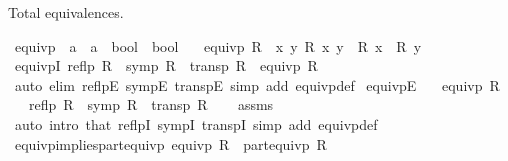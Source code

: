 \begin{isabellebody}
%
\begin{isamarkuptext}%
Total equivalences.%
\end{isamarkuptext}\isamarkuptrue%
\isamarkupfalse%
\ equivp\ {\isacharcolon}{\kern0pt}{\isacharcolon}{\kern0pt}\ {\isachardoublequoteopen}{\isacharparenleft}{\kern0pt}{\isacharprime}{\kern0pt}a\ {\isasymRightarrow}\ {\isacharprime}{\kern0pt}a\ {\isasymRightarrow}\ bool{\isacharparenright}{\kern0pt}\ {\isasymRightarrow}\ bool{\isachardoublequoteclose}\isanewline
\ \ \ {\isachardoublequoteopen}equivp\ R\ {\isasymlongleftrightarrow}\ {\isacharparenleft}{\kern0pt}{\isasymforall}x\ y{\isachardot}{\kern0pt}\ R\ x\ y\ {\isacharequal}{\kern0pt}\ {\isacharparenleft}{\kern0pt}R\ x\ {\isacharequal}{\kern0pt}\ R\ y{\isacharparenright}{\kern0pt}{\isacharparenright}{\kern0pt}{\isachardoublequoteclose}\ %
\isanewline
\isanewline
{}\isamarkupfalse%
\ equivpI{\isacharcolon}{\kern0pt}\ {\isachardoublequoteopen}reflp\ R\ {\isasymLongrightarrow}\ symp\ R\ {\isasymLongrightarrow}\ transp\ R\ {\isasymLongrightarrow}\ equivp\ R{\isachardoublequoteclose}\isanewline
%
\isadelimproof
\ \ %
\endisadelimproof
%
\isatagproof
{}\isamarkupfalse%
\ {\isacharparenleft}{\kern0pt}auto\ elim{\isacharcolon}{\kern0pt}\ reflpE\ sympE\ transpE\ simp\ add{\isacharcolon}{\kern0pt}\ equivp{\isacharunderscore}{\kern0pt}def{\isacharparenright}{\kern0pt}%
\endisatagproof
{\isafoldproof}%
%
\isadelimproof
\isanewline
%
\endisadelimproof
\isanewline
{}\isamarkupfalse%
\ equivpE{\isacharcolon}{\kern0pt}\isanewline
\ \ \ {\isachardoublequoteopen}equivp\ R{\isachardoublequoteclose}\isanewline
\ \ \ {\isachardoublequoteopen}reflp\ R{\isachardoublequoteclose}\ \ {\isachardoublequoteopen}symp\ R{\isachardoublequoteclose}\ \ {\isachardoublequoteopen}transp\ R{\isachardoublequoteclose}\isanewline
%
\isadelimproof
\ \ %
\endisadelimproof
%
\isatagproof
{}\isamarkupfalse%
\ assms\ \isamarkupfalse%
\ {\isacharparenleft}{\kern0pt}auto\ intro{\isacharbang}{\kern0pt}{\isacharcolon}{\kern0pt}\ that\ reflpI\ sympI\ transpI\ simp\ add{\isacharcolon}{\kern0pt}\ equivp{\isacharunderscore}{\kern0pt}def{\isacharparenright}{\kern0pt}%
\endisatagproof
{\isafoldproof}%
%
\isadelimproof
\isanewline
%
\endisadelimproof
\isanewline
{}\isamarkupfalse%
\ equivp{\isacharunderscore}{\kern0pt}implies{\isacharunderscore}{\kern0pt}part{\isacharunderscore}{\kern0pt}equivp{\isacharcolon}{\kern0pt}\ {\isachardoublequoteopen}equivp\ R\ {\isasymLongrightarrow}\ part{\isacharunderscore}{\kern0pt}equivp\ R{\isachardoublequoteclose}\isanewline

\end{isabellebody}
